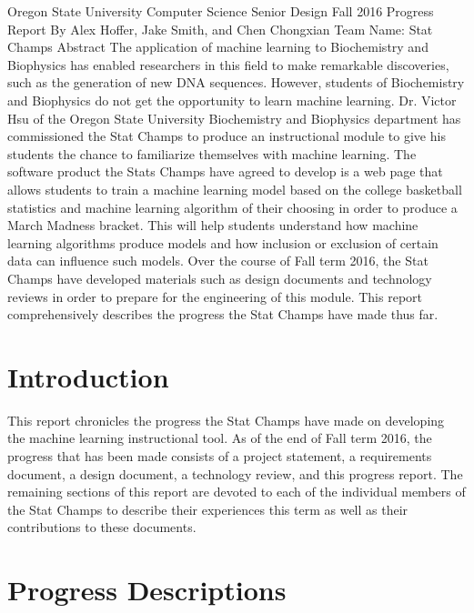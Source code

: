 \documentclass[letterpaper, 10pt,titlepage]{article}
\begin{document}
\begin{center}

Oregon State University Computer Science Senior Design Fall 2016
\bigbreak
Progress Report
\bigbreak
By Alex Hoffer, Jake Smith, and Chen Chongxian
\bigbreak
Team Name: Stat Champs
\bigbreak
\vspace{3.0cm}
Abstract
\bigbreak
The application of machine learning to Biochemistry and Biophysics has enabled researchers in this field to make remarkable discoveries, such as the generation of new DNA sequences. However, students of Biochemistry and Biophysics do not get the opportunity to learn machine learning. Dr. Victor Hsu of the Oregon State University Biochemistry and Biophysics department has commissioned the Stat Champs to produce an instructional module to give his students the chance to familiarize themselves with machine learning. The software product the Stats Champs have agreed to develop is a web page that allows students to train a machine learning model based on the college basketball statistics and machine learning algorithm of their choosing in order to produce a March Madness bracket. This will help students understand how machine learning algorithms produce models and how inclusion or exclusion of certain data can influence such models. Over the course of Fall term 2016, the Stat Champs have developed materials such as design documents and technology reviews in order to prepare for the engineering of this module. This report comprehensively describes the progress the Stat Champs have made thus far.
\newpage
\end{center}

\tableofcontents

\newpage
\section{Introduction}
This report chronicles the progress the Stat Champs have made on developing the machine learning instructional tool. As of the end of Fall term 2016, the progress that has been made consists of a project statement, a requirements document, a design document, a technology review, and this progress report. The remaining sections of this report are devoted to each of the individual members of the Stat Champs to describe their experiences this term as well as their contributions to these documents.
\section{Progress Descriptions}
\end{document}
